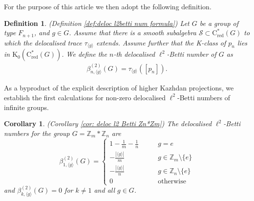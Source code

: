 \documentclass[a4paper,leqno,12pt]{article}
\numberwithin{equation}{section}
\theoremstyle{plain}
\newtheorem{introcorollary}[introtheorem]{Corollary}
\newtheorem{introdefinition}[introtheorem]{Definition}
\theoremstyle{definition}
\theoremstyle{remark}
\newcommand{\Csr}{\mathrm{C}^*_{\text{red}}}
\begin{document}
	For the purpose of this article we then adopt the following definition.
	\begin{introdefinition}
		\label{def C} 
		(Definition \ref{def:deloc l2betti num formula})
		Let $G$ be a group of type $F_{n+1}$, and $g\in G$. Assume that there is a smooth subalgebra $\mathcal S \subset \Csr (G)$ to which the delocalised trace $\tau_{\langle g\rangle}$ extends. Assume further that the K-class of $p_n$ lies in $\mathrm K_0(\Csr (G))$. We define the $n$-th delocalised $\ell^2$-Betti number of $G$ as
		\begin{gather*} 
			\beta ^{(2)}_{n, \langle g\rangle}(G) = \tau_{\langle g\rangle} ([p_n]).
		\end{gather*}
	\end{introdefinition}
	
	As a byproduct of the explicit description of higher Kazhdan projections, we establish the first calculations for non-zero delocalised $\ell^2$-Betti numbers of infinite groups. 
	
	\begin{introcorollary} 
		\label{cor D}
		(Corollary \ref{cor: deloc l2 Betti Zn*Zm})
		The delocalised $\ell^2$-Betti numbers for the group $G = \mathbb Z_m \ast \mathbb Z_n $ are
		\begin{equation*}
			\beta^{(2)}_{1, \langle{g}\rangle}(G) = 
			\begin{cases}
				1-\frac{1}{m}-\frac{1}{n} &\qquad g=e\\
				-\frac{|\langle{g}\rangle|}{m}  &\qquad g \in \mathbb Z_m \setminus \{e\}\\
				-\frac{|\langle{g}\rangle|}{n}  &\qquad g \in \mathbb Z_n \setminus \{e\}\\
				0 \qquad & \qquad  \text{otherwise} 
			\end{cases}
		\end{equation*}
		and $\beta ^{(2)}_{k, \langle{g}\rangle}(G) = 0$ for $k \neq 1$ and all $g\in G$.
	\end{introcorollary}
	
	
\end{document}
